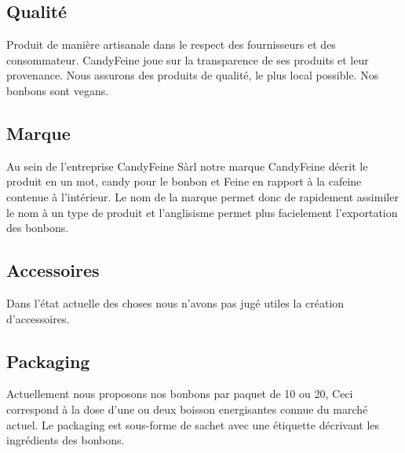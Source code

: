 \documentclass{article}
\begin{document}
\subsection{Qualité}
Produit de manière artisanale dans le respect des fournisseurs et des consommateur.
CandyFeine joue sur la transparence de ses produits et leur provenance.
Nous assurons des produits de qualité, le plus local possible. Nos bonbons sont vegans.
\subsection{Marque}
Au sein de l'entreprise CandyFeine Sàrl notre marque CandyFeine décrit le produit en un mot, candy pour le bonbon et Feine en rapport à la cafeine contenue à l'intérieur.
Le nom de la marque permet donc de rapidement assimiler le nom à un type de produit et l'anglisisme permet plus facielement l'exportation des bonbons.

\subsection{Accessoires}
Dans l'état actuelle des choses nous n'avons pas jugé utiles la création d'accessoires.

\subsection{Packaging}
Actuellement nous proposons nos bonbons par paquet de 10 ou 20, Ceci correspond à la dose d'une ou deux boisson energisantes connue du marché actuel.
Le packaging est sous-forme de sachet avec une étiquette décrivant les ingrédients des bonbons.
\end{document}
